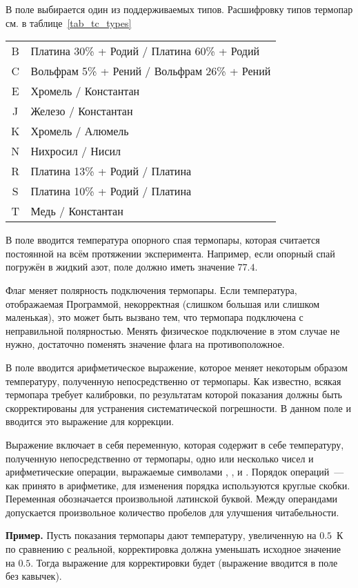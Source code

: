 В поле  выбирается один из поддерживаемых типов. Расшифровку типов термопар см. в таблице~\ref{tab_tc_types}

\begin{table*}
\begin{center}
\caption{Типы термопар}
\begin{tabular}{cl}
\hline \hline
B & Платина 30\% + Родий / Платина 60\% + Родий \\
C & Вольфрам 5\% + Рений / Вольфрам 26\% + Рений \\
E & Хромель / Константан \\
J & Железо / Константан \\
K & Хромель / Алюмель \\
N & Нихросил / Нисил \\
R & Платина 13\% + Родий / Платина \\
S & Платина 10\% + Родий / Платина \\
T & Медь / Константан \\
\hline \hline
\end{tabular}
\label{tab_tc_types}
\end{center}
\end{table*}

В поле  вводится температура опорного спая термопары, которая считается постоянной на всём протяжении эксперимента. Например, если опорный спай погружён в жидкий азот, поле должно иметь значение $77.4$.

Флаг  меняет полярность подключения термопары. Если температура, отображаемая Программой, некорректная (слишком большая или слишком маленькая), это может быть вызвано тем, что термопара подключена с неправильной полярностью. Менять физическое подключение в этом случае не нужно, достаточно поменять значение флага на противоположное.

В поле  вводится арифметическое выражение, которое меняет некоторым образом температуру, полученную непосредственно от термопары. Как известно, всякая термопара требует калибровки, по результатам которой показания должны быть скорректированы для устранения систематической погрешности. В данном поле и вводится это выражение для коррекции.

Выражение включает в себя переменную, которая содержит в себе температуру, полученную непосредственно от термопары, одно или несколько чисел и арифметические операции, выражаемые символами \CMD{+}, \CMD{-}, \CMD{*} и \CMD{/}. Порядок операций~--- как принято в арифметике, для изменения порядка используются круглые скобки. Переменная обозначается произвольной латинской буквой. Между операндами допускается произвольное количество пробелов для улучшения читабельности.

{\bf Пример. } Пусть показания термопары дают температуру, увеличенную на $0.5$~К по сравнению с реальной, корректировка должна уменьшать исходное значение на $0.5$. Тогда выражение для корректировки будет \mbox{} (выражение вводится в поле без кавычек).

